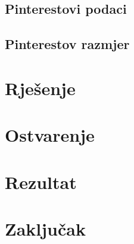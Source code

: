 \documentclass[times, utf8, seminar]{fer}
\begin{document}
\section{Pinterestovi podaci}

\section{Pinterestov razmjer}

\chapter{Rješenje}

\chapter{Ostvarenje}

\chapter{Rezultat}

\chapter{Zaključak}



\end{document}
